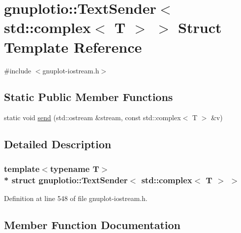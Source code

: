 \hypertarget{structgnuplotio_1_1_text_sender_3_01std_1_1complex_3_01_t_01_4_01_4}{}\section{gnuplotio\+:\+:Text\+Sender$<$ std\+:\+:complex$<$ T $>$ $>$ Struct Template Reference}
\label{structgnuplotio_1_1_text_sender_3_01std_1_1complex_3_01_t_01_4_01_4}


{\ttfamily \#include $<$gnuplot-\/iostream.\+h$>$}

\subsection*{Static Public Member Functions}
\begin{DoxyCompactItemize}
\item 
static void \hyperlink{structgnuplotio_1_1_text_sender_3_01std_1_1complex_3_01_t_01_4_01_4_ad524aa3e121d0ebd66346d77f1fd5a1c}{send} (std\+::ostream \&stream, const std\+::complex$<$ T $>$ \&v)
\end{DoxyCompactItemize}


\subsection{Detailed Description}
\subsubsection*{template$<$typename T$>$\\*
struct gnuplotio\+::\+Text\+Sender$<$ std\+::complex$<$ T $>$ $>$}



Definition at line 548 of file gnuplot-\/iostream.\+h.



\subsection{Member Function Documentation}
